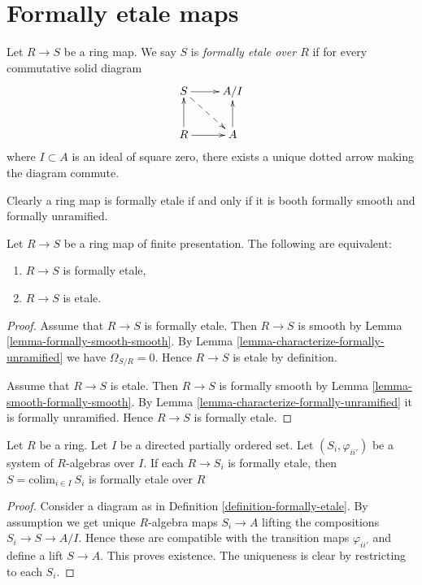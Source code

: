 \section{Formally etale maps}
\label{section-formally-etale}

\begin{definition}
\label{definition-formally-etale}
Let $R \to S$ be a ring map.
We say $S$ is {\it formally etale over $R$} if for every
commutative solid diagram
$$
\xymatrix{
S \ar[r] \ar@{-->}[rd] & A/I \\
R \ar[r] \ar[u] & A \ar[u]
}
$$
where $I \subset A$ is an ideal of square zero, there exists
a unique dotted arrow making the diagram commute.
\end{definition}

\noindent
Clearly a ring map is formally etale if and only if
it is booth formally smooth and formally unramified.

\begin{lemma}
\label{lemma-formally-etale-etale}
Let $R \to S$ be a ring map of finite presentation.
The following are equivalent:
\begin{enumerate}
\item $R \to S$ is formally etale,
\item $R \to S$ is etale.
\end{enumerate}
\end{lemma}

\begin{proof}
Assume that $R \to S$ is formally etale.
Then $R \to S$ is smooth by Lemma \ref{lemma-formally-smooth-smooth}.
By Lemma \ref{lemma-characterize-formally-unramified}
we have $\Omega_{S/R} = 0$.
Hence $R \to S$ is etale by definition.

\medskip\noindent
Assume that $R \to S$ is etale.
Then $R \to S$ is formally smooth by
Lemma \ref{lemma-smooth-formally-smooth}.
By Lemma \ref{lemma-characterize-formally-unramified}
it is formally unramified. Hence $R \to S$ is formally etale.
\end{proof}

\begin{lemma}
\label{lemma-colimit-formally-etale}
Let $R$ be a ring. Let $I$ be a directed partially ordered set.
Let $(S_i, \varphi_{ii'})$ be a system of $R$-algebras
over $I$. If each $R \to S_i$ is formally etale, then
$S = \text{colim}_{i \in I}\ S_i$ is formally etale over $R$
\end{lemma}

\begin{proof}
Consider a diagram as in Definition \ref{definition-formally-etale}.
By assumption we get unique $R$-algebra maps $S_i \to A$ lifting
the compositions $S_i \to S \to A/I$. Hence these are compatible
with the transition maps $\varphi_{ii'}$ and define a lift
$S \to A$. This proves existence.
The uniqueness is clear by restricting to each $S_i$.
\end{proof}






